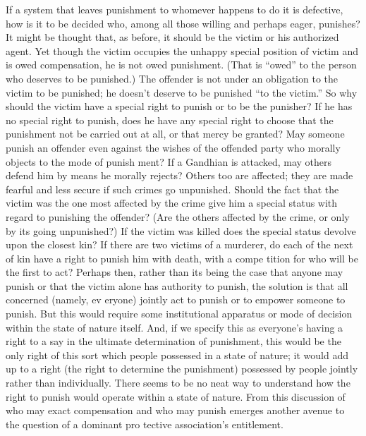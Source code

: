 \documentclass[11pt,openany]{book}
\begin{document}
If a system that leaves punishment to whomever happens to do it is defective, how is it to be decided who, among all those willing and perhaps eager, punishes? It might be thought that, as before, it should be the victim or his authorized agent. Yet though the victim occupies the unhappy special position of victim and is owed compensation, he is not owed punishment. (That is ``owed'' to the person who deserves to be punished.) The offender is not under an obligation to the victim to be punished; he doesn't deserve to be punished ``to the victim.'' So why should the victim have a special right to punish or to be the punisher? If he has no special right to punish, does he have any special right to choose that the punishment not be carried out at all, or that mercy be granted? May someone punish an offender even against the wishes of the offended party who morally objects to the mode of punish ment? If a Gandhian is attacked, may others defend him by means he morally rejects? Others too are affected; they are made fearful and less secure if such crimes go unpunished. Should the fact that the victim was the one most affected by the crime give him a special status with regard to punishing the offender? (Are the others affected by the crime, or only by its going unpunished?) If the victim was killed does the special status devolve upon the closest kin? If there are two victims of a murderer, do each of the next of kin have a right to punish him with death, with a compe tition for who will be the first to act? Perhaps then, rather than its being the case that anyone may punish or that the victim alone has authority to punish, the solution is that all concerned (namely, ev eryone) jointly act to punish or to empower someone to punish. But this would require some institutional apparatus or mode of decision within the state of nature itself. And, if we specify this as everyone's having a right to a say in the ultimate determination of punishment, this would be the only right of this sort which people possessed in a state of nature; it would add up to a right (the right to determine the punishment) possessed by people jointly rather than individually. There seems to be no neat way to understand how the right to punish would operate within a state of nature. From this discussion of who may exact compensation and who may punish emerges another avenue to the question of a dominant pro tective association's entitlement. 
\end{document}
